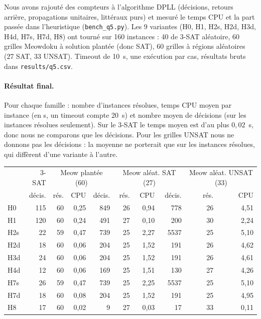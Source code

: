 \documentclass[11pt,a4paper]{article}
\newcommand{\f}[1]{\texttt{#1}}
\begin{document}
Nous avons rajouté des compteurs à l'algorithme DPLL (décisions, retours arrière, propagations unitaires, littéraux purs) et mesuré le temps CPU et la part passée dans l'heuristique (\f{bench\_q5.py}). Les 9 variantes (H0, H1, H2s, H2d, H3d, H4d, H7s, H7d, H8) ont tourné sur 160 instances : 40 de 3-SAT aléatoire, 60 grilles Meowdoku à solution plantée (donc SAT), 60 grilles à régions aléatoires (27 SAT, 33 UNSAT). Timeout de 10~s, une exécution par cas, résultats bruts dans \f{results/q5.csv}.

\paragraph{Résultat final.} Pour chaque famille : nombre d'instances résolues, temps CPU moyen par instance (en s, un timeout compte 20~s) et nombre moyen de décisions (sur les instances résolues seulement). Sur le 3-SAT le temps moyen est d'au plus $0{,}02$~s, donc nous ne comparons que les décisions. Pour les grilles UNSAT nous ne donnons pas les décisions : la moyenne ne porterait que sur les instances résolues, qui diffèrent d'une variante à l'autre.

\begin{center}
\small
\begin{tabular}{l r | rrr | rrr | rr}
\toprule
 & 3-SAT & \multicolumn{3}{c|}{Meow plantée (60)} & \multicolumn{3}{c|}{Meow aléat. SAT (27)} & \multicolumn{2}{c}{Meow aléat. UNSAT (33)} \\
 & décis. & rés. & CPU & décis. & rés. & CPU & décis. & rés. & CPU \\
\midrule
H0 & 115 & 60 & 0,25 & 849 & 26 & 0,94 & 778 & 26 & 4,51 \\
H1 & 120 & 60 & 0,24 & 491 & 27 & 0,10 & 200 & 30 & 2,24 \\
H2s & 22 & 59 & 0,47 & 739 & 25 & 2,27 & 5537 & 25 & 5,10 \\
H2d & 18 & 60 & 0,06 & 204 & 25 & 1,52 & 191 & 26 & 4,62 \\
H3d & 24 & 60 & 0,06 & 204 & 25 & 1,52 & 191 & 26 & 4,61 \\
H4d & 12 & 60 & 0,06 & 169 & 25 & 1,51 & 130 & 27 & 4,26 \\
H7s & 26 & 59 & 0,47 & 739 & 25 & 2,25 & 5537 & 25 & 5,10 \\
H7d & 18 & 60 & 0,08 & 204 & 25 & 1,52 & 191 & 25 & 4,95 \\
H8 & 17 & 60 & 0,02 & 9 & 27 & 0,03 & 17 & 33 & 0,11 \\
\bottomrule
\end{tabular}
\end{center}
\end{document}
